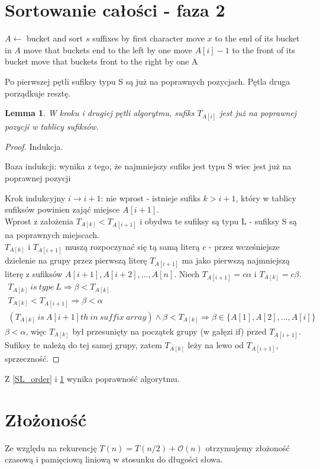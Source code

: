 \documentclass[
12pt
]{article}
\newtheorem{lemma}[theorem]{Lemma}
\theoremstyle{definition}
\theoremstyle{remark}
\begin{document}
\section*{Sortowanie całości - faza 2}
\begin{algorithmic}
\State $A \gets$ bucket and sort $s$ suffixes by first character
\State move $x$ to the end of its bucket in $A$
\State move that buckets end to the left by one
\EndFor
{}
\State move $A[i]-1$ to the front of its bucket
\State move that buckets front to the right by one
\EndIf
\EndFor
\State \Return A
\EndProcedure
\end{algorithmic}

Po pierwszej pętli sufiksy typu S są już na poprawnych pozycjach. Pętla druga porządkuje resztę.

\begin{lemma}\label{phase2-invariant}
W kroku i drugiej pętli algorytmu, sufiks $T_{A[i]}$ jest już na poprawnej pozycji w tablicy sufiksów.
\end{lemma}
\begin{proof}
Indukcja.
\item[Baza indukcji:] wynika z tego, że najmniejszy sufiks jest typu S wiec jest już na poprawnej pozycji
\item[Krok indukcyjny $i \rightarrow i+1$:] nie wprost - istnieje sufiks $k > i+1$, który w tablicy sufiksów powinien zająć miejsce $A[i+1]$.\\
Wprost z założenia $T_{A[k]} < T_{A[i+1]}$ i obydwa te sufiksy są typu L - sufiksy S są na poprawnych miejscach.\\
$T_{A[k]}$ i $T_{A[i+1]}$ muszą rozpoczynać się tą samą literą $c$ - przez wcześniejsze dzielenie na grupy przez pierwszą literę $T_{A[i+1]}$ ma jako pierwszą najmniejszą literę z sufiksów $A[i+1],A[i+2],...,A[n]$. Niech $T_{A[i+1]}=c \alpha$ i $T_{A[k]}=c \beta$.\\
\begin{gather*}
T_{A[k]}\ is\ type\ L \Rightarrow \beta < T_{A[k]}\\
T_{A[k]} < T_{A[i+1]} \Rightarrow \beta < \alpha\\
(T_{A[k]}\ is\ A[i+1]th\ in\ suffix\ array) \land \beta < T_{A[k]} \Rightarrow \beta \in \{A[1],A[2],...,A[i]\}
\end{gather*}
$\beta < \alpha$, więc $T_{A[k]}$ był przesunięty na początek grupy (w gałęzi if) przed $T_{A[i+1]}$. Sufiksy te należą do tej samej grupy, zatem $T_{A[k]}$ leży na lewo od $T_{A[i+1]}$, sprzeczność.
\end{proof}

Z \cref{SL_order} i \cref{phase2-invariant} wynika poprawność algorytmu.


\section*{Złożoność}
Ze względu na rekurencję $T(n) = T(n/2) + \mathcal{O}(n)$ otrzymujemy złożoność czasową i pamięciową liniową w stosunku do długości słowa.
\end{document}
